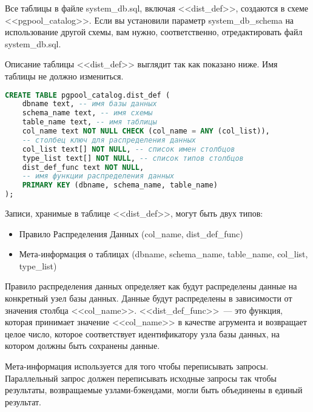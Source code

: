Все таблицы в файле system\_db.sql, включая <<dist\_def>>, создаются в схеме <<pgpool\_catalog>>. Если вы установили
параметр system\_db\_schema на использование другой схемы, вам нужно, соответственно, отредактировать файл system\_db.sql.

Описание таблицы <<dist\_def>> выглядит так как показано ниже. Имя таблицы не должно измениться.
\begin{lstlisting}[language=SQL,label=lst:pgpool31,caption=Создание таблицы dist\_def]
CREATE TABLE pgpool_catalog.dist_def (
    dbname text, -- имя базы данных
    schema_name text, -- имя схемы
    table_name text, -- имя таблицы
    col_name text NOT NULL CHECK (col_name = ANY (col_list)),
    -- столбец ключ для распределения данных
    col_list text[] NOT NULL, -- список имен столбцов
    type_list text[] NOT NULL, -- список типов столбцов
    dist_def_func text NOT NULL,
    -- имя функции распределения данных
    PRIMARY KEY (dbname, schema_name, table_name)
);
\end{lstlisting}

Записи, хранимые в таблице <<dist\_def>>, могут быть двух типов:
\begin{itemize}
\item Правило Распределения Данных (col\_name, dist\_def\_func)
\item Мета-информация о таблицах (dbname, schema\_name, table\_name, col\_list, type\_list)
\end{itemize}

Правило распределения данных определяет как будут распределены данные на конкретный узел базы данных. Данные будут
распределены в зависимости от значения столбца <<col\_name>>. <<dist\_def\_func>>~--- это функция, которая принимает
значение <<col\_name>> в качестве агрумента и возвращает целое число, которое соответствует идентификатору узла
базы данных, на котором должны быть сохранены данные.

Мета-информация используется для того чтобы переписывать запросы. Параллельный запрос должен переписывать исходные запросы
так чтобы результаты, возвращаемые узлами-бэкендами, могли быть объединены в единый результат.


